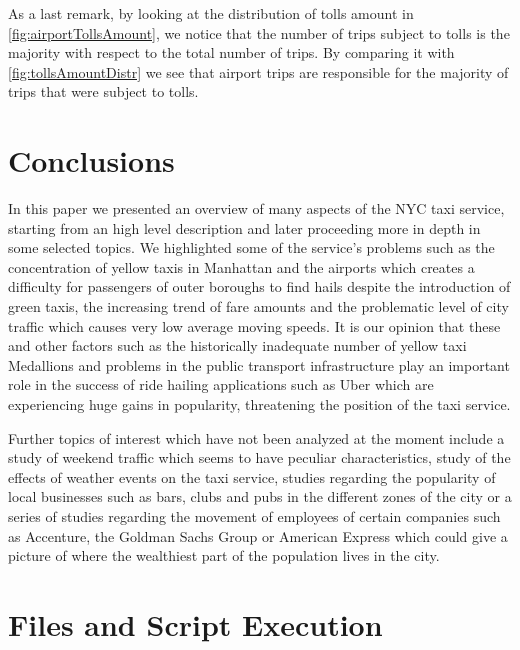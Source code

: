 \documentclass{acm_proc_article-sp-sigmod09}
\begin{document}
As a last remark, by looking at the distribution of tolls amount in \cref{fig:airportTollsAmount}, we notice that the number of trips subject to tolls is the majority with respect to the total number of trips. By comparing it with \cref{fig:tollsAmountDistr} we see that airport trips are responsible for the majority of trips that were subject to tolls.

\section{Conclusions}

In this paper we presented an overview of many aspects of the NYC taxi service, starting from an high level description and later proceeding more in depth in some selected topics. We highlighted some of the service's problems such as the concentration of yellow taxis in Manhattan and the airports which creates a difficulty for passengers of outer boroughs to find hails despite the introduction of green taxis, the increasing trend of fare amounts and the problematic level of city traffic which causes very low average moving speeds. It is our opinion that these and other factors such as the historically inadequate number of yellow taxi Medallions and problems in the public transport infrastructure play an important role in the success of ride hailing applications such as Uber which are experiencing huge gains in popularity, threatening the position of the taxi service.

Further topics of interest which have not been analyzed at the moment include a study of weekend traffic which seems to have peculiar characteristics, study of the effects of weather events on the taxi service, studies regarding the popularity of local businesses such as bars, clubs and pubs in the different zones of the city or a series of studies regarding the movement of employees of certain companies such as Accenture, the Goldman Sachs Group or American Express which could give a picture of where the wealthiest part of the population lives in the city.

%




\balancecolumns
\appendix
\section{Files and Script Execution}
\end{document}
